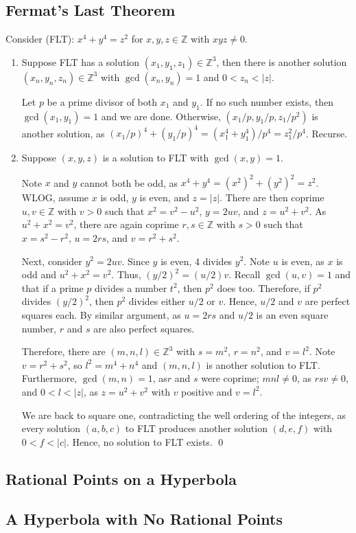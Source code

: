 \documentclass{article}
\newcommand{\Z}{\mathbb{Z}}
\begin{document}
\subsection{Fermat's Last Theorem}
  Consider (FLT): $x^4+y^4=z^2$ for $x,y,z\in\Z$ with $xyz\ne0$.
  \begin{enumerate}[label=\textbf{(\alph*)}]
    \item{
      Suppose FLT has a solution $(x_1,y_1,z_1)\in\Z^3$, then there is another
      solution $(x_n,y_n,z_n)\in\Z^3$ with $\gcd(x_n,y_n)=1$ and $0<z_n<|z|$.

      Let $p$ be a prime divisor of both $x_1$ and $y_1$. If no such number
      exists, then $\gcd(x_1,y_1)=1$ and we are done. Otherwise, $(x_1/p,y_1/p,
      z_1/p^2)$ is another solution, as $(x_1/p)^4+(y_1/p)^4=(x_1^4+y_1^4)/p^4=
      z_1^2/p^4$. Recurse.
    }
    \item{
      Suppose $(x,y,z)$ is a solution to FLT with $\gcd(x,y)=1$.

      Note $x$ and $y$ cannot both be odd, as $x^4+y^4=(x^2)^2+(y^2)^2=z^2$.
      WLOG, assume $x$ is odd, $y$ is even, and $z=|z|$. There are then coprime
      $u,v\in\Z$ with $v>0$ such that $x^2=v^2-u^2$, $y=2uv$, and $z=u^2+v^2$.
      As $u^2+x^2=v^2$, there are again coprime $r,s\in\Z$ with
      $s>0$ such that $x=s^2-r^2$, $u=2rs$, and $v=r^2+s^2$.

      Next, consider $y^2=2uv$. Since $y$ is even, 4 divides $y^2$. Note $u$
      is even, as $x$ is odd and $u^2+x^2=v^2$. Thus, $(y/2)^2=(u/2)v$. Recall
      $\gcd(u,v)=1$ and that if a prime $p$ divides a number $t^2$, then $p^2$
      does too. Therefore, if $p^2$ divides $(y/2)^2$, then $p^2$ divides either
      $u/2$ or $v$. Hence, $u/2$ and $v$ are perfect squares each. By similar
      argument, as $u=2rs$ and $u/2$ is an even square number, $r$ and $s$ are
      also perfect squares.

      Therefore, there are $(m,n,l)\in\Z^3$ with $s=m^2$, $r=n^2$, and $v=l^2$.
      Note $v=r^2+s^2$, so $l^2=m^4+n^4$ and $(m,n,l)$ is another solution to
      FLT. Furthermore, $\gcd(m,n)=1$, as$r$ and $s$ were coprime; $mnl\ne0$, as
      $rsv\ne0$, and $0<l<|z|$, as $z=u^2+v^2$ with $v$ positive and $v=l^2$.

      We are back to square one, contradicting the well ordering of the
      integers, as every solution $(a,b,c)$ to FLT produces another solution
      $(d,e,f)$ with $0<f<|c|$. Hence, no solution to FLT exists.
      \qed
    }
  \end{enumerate}

\subsection{Rational Points on a Hyperbola}

\subsection{A Hyperbola with No Rational Points}
\end{document}
